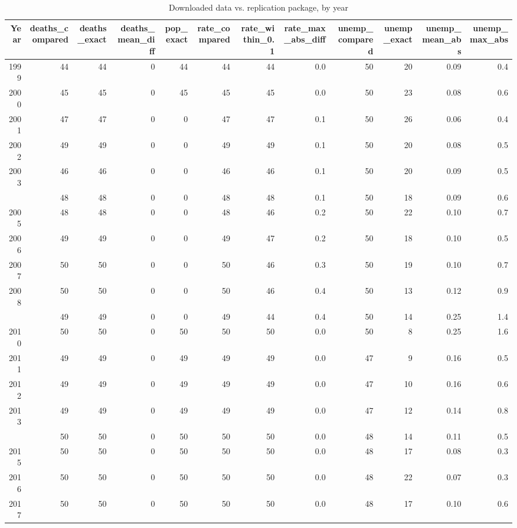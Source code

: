 \begin{table}

\caption{Downloaded data vs. replication package, by year}
\centering
\begin{tabular}[t]{rrrrrrrrrrrr}
\toprule
Year & deaths\_compared & deaths\_exact & deaths\_mean\_diff & pop\_exact & rate\_compared & rate\_within\_0.1 & rate\_max\_abs\_diff & unemp\_compared & unemp\_exact & unemp\_mean\_abs & unemp\_max\_abs\\
\midrule
1999 & 44 & 44 & 0 & 44 & 44 & 44 & 0.0 & 50 & 20 & 0.09 & 0.4\\
2000 & 45 & 45 & 0 & 45 & 45 & 45 & 0.0 & 50 & 23 & 0.08 & 0.6\\
2001 & 47 & 47 & 0 & 0 & 47 & 47 & 0.1 & 50 & 26 & 0.06 & 0.4\\
2002 & 49 & 49 & 0 & 0 & 49 & 49 & 0.1 & 50 & 20 & 0.08 & 0.5\\
2003 & 46 & 46 & 0 & 0 & 46 & 46 & 0.1 & 50 & 20 & 0.09 & 0.5\\
\addlinespace
2004 & 48 & 48 & 0 & 0 & 48 & 48 & 0.1 & 50 & 18 & 0.09 & 0.6\\
2005 & 48 & 48 & 0 & 0 & 48 & 46 & 0.2 & 50 & 22 & 0.10 & 0.7\\
2006 & 49 & 49 & 0 & 0 & 49 & 47 & 0.2 & 50 & 18 & 0.10 & 0.5\\
2007 & 50 & 50 & 0 & 0 & 50 & 46 & 0.3 & 50 & 19 & 0.10 & 0.7\\
2008 & 50 & 50 & 0 & 0 & 50 & 46 & 0.4 & 50 & 13 & 0.12 & 0.9\\
\addlinespace
2009 & 49 & 49 & 0 & 0 & 49 & 44 & 0.4 & 50 & 14 & 0.25 & 1.4\\
2010 & 50 & 50 & 0 & 50 & 50 & 50 & 0.0 & 50 & 8 & 0.25 & 1.6\\
2011 & 49 & 49 & 0 & 49 & 49 & 49 & 0.0 & 47 & 9 & 0.16 & 0.5\\
2012 & 49 & 49 & 0 & 49 & 49 & 49 & 0.0 & 47 & 10 & 0.16 & 0.6\\
2013 & 49 & 49 & 0 & 49 & 49 & 49 & 0.0 & 47 & 12 & 0.14 & 0.8\\
\addlinespace
2014 & 50 & 50 & 0 & 50 & 50 & 50 & 0.0 & 48 & 14 & 0.11 & 0.5\\
2015 & 50 & 50 & 0 & 50 & 50 & 50 & 0.0 & 48 & 17 & 0.08 & 0.3\\
2016 & 50 & 50 & 0 & 50 & 50 & 50 & 0.0 & 48 & 22 & 0.07 & 0.3\\
2017 & 50 & 50 & 0 & 50 & 50 & 50 & 0.0 & 48 & 17 & 0.10 & 0.6\\
\bottomrule
\end{tabular}
\end{table}
